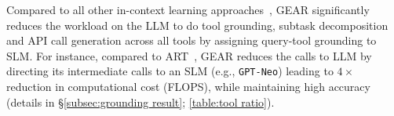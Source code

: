 \documentclass[11pt]{article}
\newcommand{\daniel}[1]{{\color{purple}[DK: #1]}}
\newcommand{\danielchange}[2]{{\color{red}{\st{#1}}{#2}}}
\newcommand{\llm}{\textcolor{darkredTwo}{LLM}}
\newcommand{\slm}{\textcolor{darkblueTwo}{SLM}}
\newcommand{\name}{{\fontfamily{cmss}\selectfont GEAR}}
\newcommand{\gptNeo}{{\tt \textcolor{darkblueTwo}{GPT-Neo}}}
\begin{document}
Compared to all other in-context learning approaches~\citep{li2023api, paranjape2023art}, \name{} significantly reduces the workload on the \llm{} to do tool grounding, subtask decomposition and API call generation across all tools by assigning query-tool grounding to \slm{}. 
For instance, compared to ART~\citep{paranjape2023art}, \name{} reduces the calls to \llm{} by directing its intermediate calls to an \slm{} (e.g., \gptNeo) leading to $4\times$ reduction in computational cost (FLOPS), while maintaining high accuracy (details in \S\ref{subsec:grounding result}; \autoref{table:tool ratio}).
\end{document}
